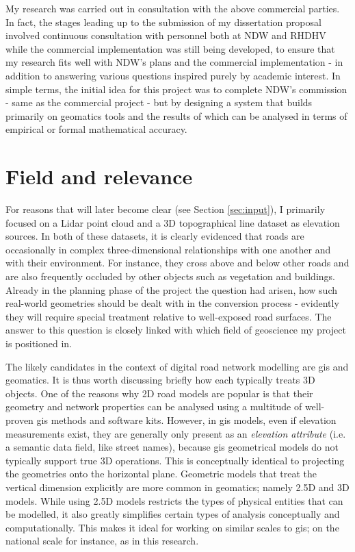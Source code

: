 My research was carried out in consultation with the above commercial parties. In fact, the stages leading up to the submission of my dissertation proposal involved continuous consultation with personnel both at NDW and RHDHV while the commercial implementation was still being developed, to ensure that my research fits well with NDW's plans and the commercial implementation - in addition to answering various questions inspired purely by academic interest. In simple terms, the initial idea for this project was to complete NDW's commission - same as the commercial project - but by designing a system that builds primarily on geomatics tools and the results of which can be analysed in terms of empirical or formal mathematical accuracy.

\section{Field and relevance}
\label{sec:relevance}

For reasons that will later become clear (see Section \ref{sec:input}), I primarily focused on a Lidar point cloud and a 3D topographical line dataset as elevation sources. In both of these datasets, it is clearly evidenced that roads are occasionally in complex three-dimensional relationships with one another and with their environment. For instance, they cross above and below other roads and are also frequently occluded by other objects such as vegetation and buildings. Already in the planning phase of the project the question had arisen, how such real-world geometries should be dealt with in the conversion process - evidently they will require special treatment relative to well-exposed road surfaces. The answer to this question is closely linked with which field of geoscience my project is positioned in.

The likely candidates in the context of digital road network modelling are \ac{gis} and geomatics. It is thus worth discussing briefly how each typically treats 3D objects. One of the reasons why 2D road models are popular is that their geometry and network properties can be analysed using a multitude of well-proven \ac{gis} methods and software kits. However, in \ac{gis} models, even if elevation measurements exist, they are generally only present as an \textit{elevation attribute} (i.e. a semantic data field, like street names), because \ac{gis} geometrical models do not typically support true 3D operations. This is conceptually identical to projecting the geometries onto the horizontal plane. Geometric models that treat the vertical dimension explicitly are more common in geomatics; namely 2.5D and 3D models. While using 2.5D models restricts the types of physical entities that can be modelled, it also greatly simplifies certain types of analysis conceptually and computationally. This makes it ideal for working on similar scales to \ac{gis}; on the national scale for instance, as in this research.

